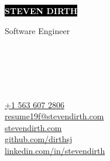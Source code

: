\documentclass[9pt]{developercv} %
\begin{document}

\begin{minipage}[t]{0.5\textwidth} %
	\vspace{-\baselineskip} %

	\colorbox{black}{{\HUGE\textcolor{white}{\textbf{\MakeUppercase{Steven Dirth}}}}}
	
	\vspace{6pt}
	
	{\huge Software Engineer} %
\end{minipage}
\begin{minipage}[t]{0.03\textwidth} %
	\vspace{-\baselineskip} %
	{\large
		\faPhone \\
		\faEnvelope \\
		\faLink \\
		\faGithub \\
		\faLinkedin
	}
\end{minipage}
\begin{minipage}[t]{0.27\textwidth} %
	\vspace{-\baselineskip} %
	{\large
		\href{tel:15636072806}{+1 563 607 2806} \\
		\href{mailto:resume19f@stevendirth.com}{resume19f@stevendirth.com} \\
		\href{https://stevendirth.com}{stevendirth.com} \\
		\href{https://github.com/dirthsj}{github.com/dirthsj} \\
		\href{https://linkedin.com/in/stevendirth}{linkedin.com/in/stevendirth}
	}
\end{minipage}
\begin{minipage}[t]{0.20\textwidth} %
	\vspace{-\baselineskip} %

	\hfill {}

\end{minipage}

\end{document}
